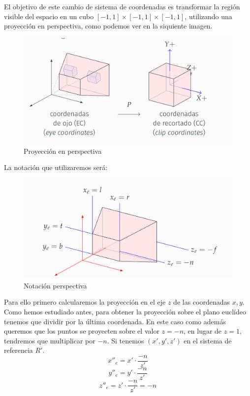 \documentclass[a4paper,11pt, oneside]{book}
\begin{document}
El objetivo de este cambio de sistema de coordenadas es transformar la región visible del espacio en un cubo $[-1,1]\times [-1,1]\times [-1,1]$, utilizando una proyección en perspectiva, como podemos ver en la siquiente imagen.
\begin{figure}[H]
	
	\centering
	\includegraphics[width=0.9\linewidth]{cubo}
	\caption{Proyección en perspectiva}
	\label{fig:figura1}
	
\end{figure}

La notación que utilizaremos será:
\begin{figure}[H]
	
	\centering
	\includegraphics[width=0.9\linewidth]{notacion}
	\caption{Notación perspectiva}
	\label{fig:figura1}
	
\end{figure}

Para ello primero calcularemos la proyección en el eje $z$ de las coordenadas $x,y$. Como hemos estudiado antes, para obtener la proyección sobre el plano euclídeo tenemos que dividir por la última coordenada. En este caso como además queremos que los puntos se proyecten sobre el valor $z=-n$, en lugar de $z=1$, tendremos que multiplicar por $-n$. Si tenemos $(x',y',z')$ en el sistema de referencia $R'$.
\begin{equation}
x''_e = x'\cdot\frac{-n}{z'}
\end{equation}
\begin{equation}
y''_e = y'\cdot\frac{-n}{z'}
\end{equation}
\begin{equation}
z''_e = z'\cdot\frac{-n}{z'} = -n
\end{equation}
\end{document}
